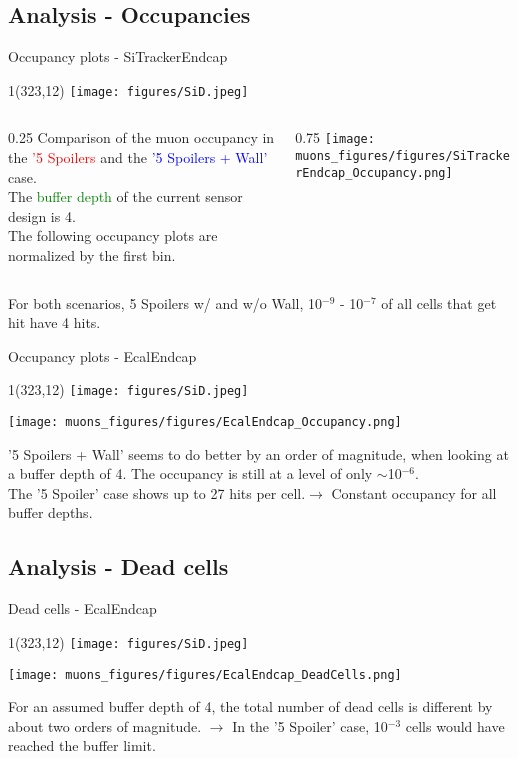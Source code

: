 \documentclass[xcolor={dvipsnames}]{beamer}
\newcommand{\sidlogo}{
  \setlength{\TPHorizModule}{1pt}
  \setlength{\TPVertModule}{1pt}
  \begin{textblock}{1}(323,12)
   \texttt{[image: figures/SiD.jpeg]}
  \end{textblock}
  }
\begin{document}
\subsection{Analysis - Occupancies}
\begin{frame}{Occupancy plots - \small SiTrackerEndcap}
\sidlogo
\begin{columns}
 \begin{column}{0.25\textwidth}
 \small
  Comparison of the muon occupancy in the \textcolor{red}{'5 Spoilers} and the \textcolor{blue}{'5 Spoilers + Wall'} case.\\{\small The \textcolor{green}{buffer depth} of the current sensor design is 4.}\\
  \vspace*{0.2cm}
  {\footnotesize The following occupancy plots are normalized by the first bin.}
 \end{column}
 \begin{column}{0.75\textwidth}
\texttt{[image: muons\_figures/figures/SiTrackerEndcap\_Occupancy.png]}
\end{column}
\end{columns}
For both scenarios, 5 Spoilers w/ and w/o Wall, 10$^{-9}$ - 10$^{-7}$ of all cells that get hit have 4 hits.
\end{frame}
\begin{frame}{Occupancy plots - \small EcalEndcap}
\sidlogo
 \begin{center}
\texttt{[image: muons\_figures/figures/EcalEndcap\_Occupancy.png]}
\end{center}
\small '5 Spoilers + Wall' seems to do better by an order of magnitude, when looking at a buffer depth of 4. The occupancy is still at a level of only $\sim$10$^{-6}$.\\
\small The '5 Spoiler' case shows up to 27 hits per cell.$\rightarrow$ Constant occupancy for all buffer depths.
\end{frame}

\subsection{Analysis - Dead cells}
\begin{frame}{Dead cells - \small EcalEndcap}
\sidlogo
 \begin{center}
\texttt{[image: muons\_figures/figures/EcalEndcap\_DeadCells.png]}
\end{center}
\small For an assumed buffer depth of 4, the total number of dead cells is different by about two orders of magnitude. $\rightarrow$ In the '5 Spoiler' case, 10$^{-3}$ cells would have reached the buffer limit.
\end{frame}
\end{document}
